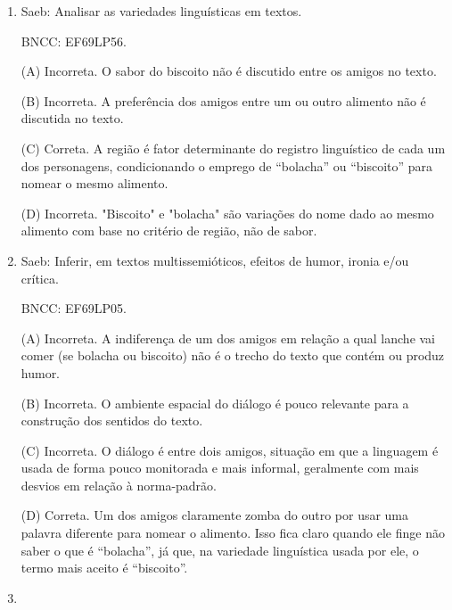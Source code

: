 \begin{enumerate}
(B) Correta. O narrador, com essa ressalva, se exime de
garantir a
veracidade da história e deixa para o ouvinte/leitor a responsabilidade
de acreditar ou não, conforme queira.

(C) Incorreta. O narrador, nesse trecho, já está contando a história
para o ouvinte/leitor. Não se trata, portanto, de um comentário seu
sobre a veracidade dela.

(D) Incorreta. O narrador apenas situa a história no espaço para
contextualizar o ouvinte/leitor.

\item

Saeb: Analisar as variedades linguísticas em textos.

BNCC: EF69LP56.

(A) Incorreta. O sabor do biscoito não é discutido entre os amigos no
texto.

(B) Incorreta. A preferência dos amigos entre um ou outro alimento não é
discutida no texto.

(C) Correta. A região é fator determinante do registro linguístico de
cada um dos personagens, condicionando o emprego de ``bolacha'' ou
``biscoito'' para nomear o mesmo alimento.

(D) Incorreta. "Biscoito" e "bolacha" são variações do nome dado ao mesmo
alimento com base no critério de região, não de sabor.

\item

Saeb: Inferir, em textos multissemióticos, efeitos de humor, ironia e/ou
crítica.

BNCC: EF69LP05.

(A) Incorreta. A indiferença de um dos amigos em relação a qual lanche
vai comer (se bolacha ou biscoito) não é o trecho do texto que contém ou produz humor.

(B) Incorreta. O ambiente espacial do diálogo é pouco relevante para a
construção dos sentidos do texto.

(C) Incorreta. O diálogo é entre dois amigos, situação em que a
linguagem é usada de forma pouco monitorada e mais informal, geralmente
com mais desvios em relação à norma-padrão.

(D) Correta. Um dos amigos claramente zomba do outro por usar uma
palavra diferente para nomear o alimento. Isso fica claro quando ele
finge não saber o que é ``bolacha'', já que, na variedade linguística usada por ele, o termo mais aceito é ``biscoito''.

\item


\end{enumerate}
